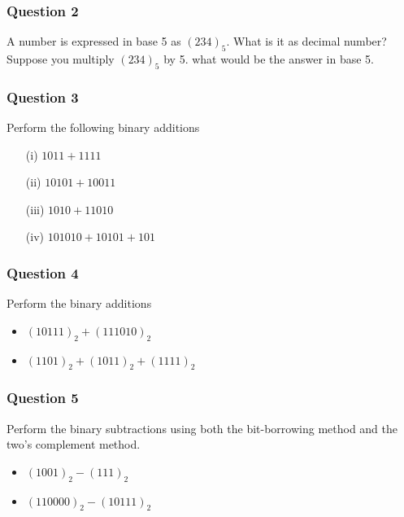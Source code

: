 \documentclass[]{report}
\begin{document}
\begin{enumerate}
\begin{itemize}
\end{itemize}
\subsubsection*{Question 2}
A number is expressed in base 5 as $(234)_5$. What is it as decimal number?
Suppose you multiply $(234)_5$ by 5. what would be the answer in base 5.

\subsubsection*{Question 3}

Perform the following binary additions
\begin{multicols}{2}
\begin{itemize}
\item[(i)] $1011+ 1111$
\item[(ii)] $10101  + 10011$
\item[(iii)] $1010 + 11010$
\item[(iv)] $101010 + 10101 + 101$
\end{itemize}
\end{multicols}


\subsubsection*{Question 4}
Perform the binary additions

\begin{itemize}
\item $(10111)_2 +(111010)_2$

\item $(1101)_2 + (1011)_2 + (1111)_2$
\end{itemize}

\subsubsection*{Question 5}

Perform the binary subtractions using both the bit-borrowing method and the two's complement method.
\begin{itemize}
\item $(1001)_2 -(111)_2$
\item $(110000)_2 -(10111)_2$
\end{itemize}



\end{enumerate}
\end{document}

